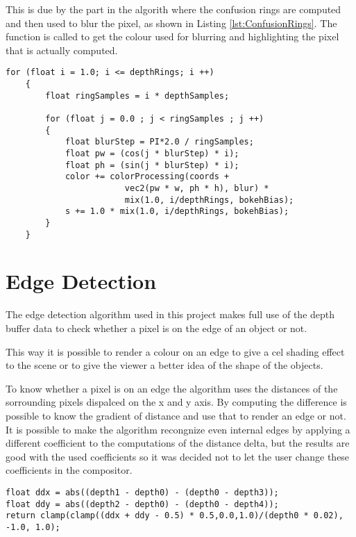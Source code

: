 This is due by the part in the algorith where the confusion rings are computed and then used
to blur the pixel, as shown in Listing \ref{lst:ConfusionRings}. The 
function is called to get the colour used for blurring and highlighting the pixel that is actually
computed.

\label{lst:ConfusionRings}\begin{lstlisting}
for (float i = 1.0; i <= depthRings; i ++)
	{
		float ringSamples = i * depthSamples;

		for (float j = 0.0 ; j < ringSamples ; j ++)
		{
			float blurStep = PI*2.0 / ringSamples;
			float pw = (cos(j * blurStep) * i);
			float ph = (sin(j * blurStep) * i);
			color += colorProcessing(coords +
						vec2(pw * w, ph * h), blur) *
						mix(1.0, i/depthRings, bokehBias);
			s += 1.0 * mix(1.0, i/depthRings, bokehBias);
		}
	}
\end{lstlisting}


\section{Edge Detection}

  The edge detection algorithm used in this project makes full use of the depth buffer data to check whether a pixel is
  on the edge of an object or not.
  
  This way it is possible to render a colour on an edge to give a cel shading effect to the scene or to give the
  viewer a better idea of the shape of the objects.
  
  To know whether a pixel is on an edge the algorithm uses the distances of the sorrounding pixels dispalced on the x and
  y axis. By computing the difference is possible to know the gradient of distance and use that to render an edge or not.
  It is possible to make the algorithm recongnize even internal edges by applying a different coefficient to the computations
  of the distance delta, but the results are good with the used coefficients so it was decided not to let the user change 
  these coefficients in the compositor.
  
  \label{lst:EdgeDetect}\begin{lstlisting}
float ddx = abs((depth1 - depth0) - (depth0 - depth3));
float ddy = abs((depth2 - depth0) - (depth0 - depth4));
return clamp(clamp((ddx + ddy - 0.5) * 0.5,0.0,1.0)/(depth0 * 0.02), -1.0, 1.0);
  \end{lstlisting}

